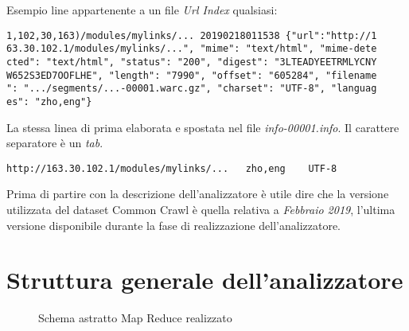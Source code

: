 \documentclass{article}
\newcommand{\CC}{Common Crawl}
\newcommand{\filename}[1]{\textit{#1}}
\begin{document}
Esempio line appartenente a un file \textit{Url Index} qualsiasi:
\begin{verbatim}
1,102,30,163)/modules/mylinks/... 20190218011538 {"url":"http://1
63.30.102.1/modules/mylinks/...", "mime": "text/html", "mime-dete
cted": "text/html", "status": "200", "digest": "3LTEADYEETRMLYCNY
W652S3ED7OOFLHE", "length": "7990", "offset": "605284", "filename
": ".../segments/...-00001.warc.gz", "charset": "UTF-8", "languag
es": "zho,eng"}
\end{verbatim}
La stessa linea di prima elaborata e spostata nel file \filename{info-00001.info}. Il carattere separatore è un \textit{tab}.
\begin{verbatim}
http://163.30.102.1/modules/mylinks/...   zho,eng    UTF-8 
\end{verbatim}

Prima di partire con la descrizione dell'analizzatore è utile dire che la versione utilizzata del dataset \CC{} è quella relativa a \textit{Febbraio 2019}, l'ultima versione disponibile durante la fase di realizzazione dell'analizzatore. 

\section{Struttura generale dell'analizzatore}

\begin{figure}[H]
  \centering
  
  \caption{Schema astratto Map Reduce realizzato}
\end{figure}
\end{document}
